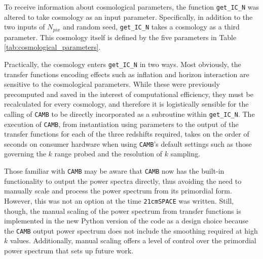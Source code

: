 \documentclass[floats,floatfix,showpacs,amssymb,prd,superscriptaddress,nofootinbib]{revtex4-2} %
\newcommand{\code}{\texttt}
\newcommand{\red}{\textcolor{red}}
\begin{document}

To receive information about cosmological parameters, the function \code{get\_IC\_N} was altered to take cosmology as an input parameter. Specifically, in addition to the two inputs of $N_{pix}$ and random seed, \code{get\_IC\_N} takes a cosmology as a third parameter. This cosmology itself is defined by the five parameters in Table \ref{tab:cosmological_parameters}.

Practically, the cosmology enters \code{get\_IC\_N} in two ways. Most obviously, the transfer functions encoding effects such as inflation and horizon interaction are sensitive to the cosmological parameters. While these were previously precomputed and saved in the interest of computational efficiency, they must be recalculated for every cosmology, and therefore it is logistically sensible for the calling of \code{CAMB} to be directly incorporated as a subroutine within \code{get\_IC\_N}. The execution of \code{CAMB}, from instantiation using parameters to the output of the transfer functions for each of the three redshifts required, takes on the order of seconds on consumer hardware when using \code{CAMB}'s default settings such as those governing the $k$ range probed and the resolution of $k$ sampling. %

Those familiar with \code{CAMB} may be aware that \code{CAMB} now has the built-in functionality to output the power spectra directly, thus avoiding the need to manually scale and process the power spectrum from its primordial form. However, this was not an option at the time \code{21cmSPACE} was written. Still, though, the manual scaling of the power spectrum from transfer functions is implemented in the new Python version of the code as a design choice because the \code{CAMB} output power spectrum does not include the smoothing required at high $k$ values. Additionally, manual scaling offers a level of control over the primordial power spectrum that sets up future work.
\end{document}
